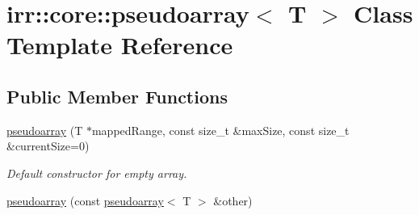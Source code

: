 \hypertarget{classirr_1_1core_1_1pseudoarray}{}\section{irr\+:\+:core\+:\+:pseudoarray$<$ T $>$ Class Template Reference}
\label{classirr_1_1core_1_1pseudoarray}
\subsection*{Public Member Functions}
\begin{DoxyCompactItemize}
\item 
\hyperlink{classirr_1_1core_1_1pseudoarray_a1c1e832bac5efcf695e7fb140c167062}{pseudoarray} (T $\ast$mapped\+Range, const size\+\_\+t \&max\+Size, const size\+\_\+t \&current\+Size=0)\hypertarget{classirr_1_1core_1_1pseudoarray_a1c1e832bac5efcf695e7fb140c167062}{}\label{classirr_1_1core_1_1pseudoarray_a1c1e832bac5efcf695e7fb140c167062}

\begin{DoxyCompactList}\small\item\em Default constructor for empty array. \end{DoxyCompactList}\item 
\hyperlink{classirr_1_1core_1_1pseudoarray_af06422a66e1948e9d25a432b9b62d221}{pseudoarray} (const \hyperlink{classirr_1_1core_1_1pseudoarray}{pseudoarray}$<$ T $>$ \&other)\hypertarget{classirr_1_1core_1_1pseudoarray_af06422a66e1948e9d25a432b9b62d221}{}\label{classirr_1_1core_1_1pseudoarray_af06422a66e1948e9d25a432b9b62d221}


\end{DoxyCompactItemize}
